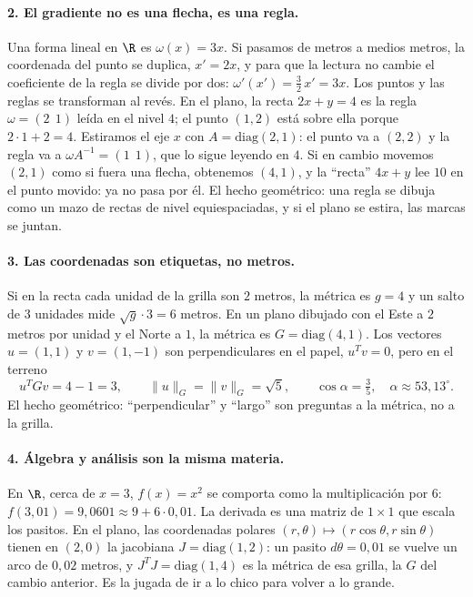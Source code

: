\paragraph{2. El gradiente no es una flecha, es una regla.}
Una forma lineal en \(\R\) es \(\omega(x)=3x\). Si pasamos de metros a medios metros, la
coordenada del punto se duplica, \(x'=2x\), y para que la lectura no cambie el coeficiente
de la regla se divide por dos: \(\omega'(x')=\tfrac32\,x'=3x\). Los puntos y las reglas se
transforman al revés. En el plano, la recta \(2x+y=4\) es la regla \(\omega=(2\ \ 1)\)
leída en el nivel \(4\); el punto \((1,2)\) está sobre ella porque \(2\cdot1+2=4\).
Estiramos el eje \(x\) con \(A=\mathrm{diag}(2,1)\): el punto va a \((2,2)\) y la regla va a
\(\omega A^{-1}=(1\ \ 1)\), que lo sigue leyendo en \(4\). Si en cambio movemos \((2,1)\)
como si fuera una flecha, obtenemos \((4,1)\), y la ``recta'' \(4x+y\) lee \(10\) en el
punto movido: ya no pasa por él. El hecho geométrico: una regla se dibuja como un mazo de
rectas de nivel equiespaciadas, y si el plano se estira, las marcas se juntan.

\paragraph{3. Las coordenadas son etiquetas, no metros.}
Si en la recta cada unidad de la grilla son \(2\) metros, la métrica es \(g=4\) y un salto
de \(3\) unidades mide \(\sqrt{g}\cdot3=6\) metros. En un plano dibujado con el Este a
\(2\) metros por unidad y el Norte a \(1\), la métrica es \(G=\mathrm{diag}(4,1)\). Los
vectores \(u=(1,1)\) y \(v=(1,-1)\) son perpendiculares en el papel, \(u^Tv=0\), pero en el
terreno
\[
  u^TGv=4-1=3,\qquad \|u\|_G=\|v\|_G=\sqrt5,\qquad \cos\alpha=\tfrac35,\quad
  \alpha\approx53{,}13^\circ .
\]
El hecho geométrico: ``perpendicular'' y ``largo'' son preguntas a la métrica, no a la
grilla.

\paragraph{4. Álgebra y análisis son la misma materia.}
En \(\R\), cerca de \(x=3\), \(f(x)=x^2\) se comporta como la multiplicación por \(6\):
\(f(3{,}01)=9{,}0601\approx9+6\cdot0{,}01\). La derivada es una matriz de \(1\times1\) que
escala los pasitos. En el plano, las coordenadas polares \((r,\theta)\mapsto(r\cos\theta,
r\sin\theta)\) tienen en \((2,0)\) la jacobiana \(J=\mathrm{diag}(1,2)\): un pasito
\(d\theta=0{,}01\) se vuelve un arco de \(0{,}02\) metros, y \(J^TJ=\mathrm{diag}(1,4)\) es
la métrica de esa grilla, la \(G\) del cambio anterior. Es la jugada de
ir a lo chico para volver a lo grande.

